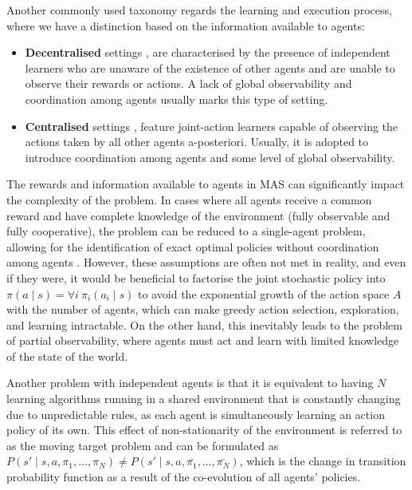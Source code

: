 \documentclass[a4paper,singleside,12pt]{report} %
\begin{document}
Another commonly used taxonomy regards the learning and execution process, where we have a distinction based on the information available to agents:

\begin{itemize}
\item
  \textbf{Decentralised} settings \cite{Bowling2002MultiagentLU, kapetanakis2002reinforcement}, are characterised by the presence of independent learners who are unaware of the existence of other agents and are unable to observe their rewards or actions. A lack of global observability and coordination among agents usually marks this type of setting.
\item
  \textbf{Centralised} settings \cite{hu2003nash, littman2001friend}, feature joint-action learners capable of observing the actions taken by all other agents a-posteriori. Usually, it is adopted to introduce coordination among agents and some level of global observability.
\end{itemize}

The rewards and information available to agents in MAS can significantly impact the complexity of the problem. In cases where all agents receive a common reward and have complete knowledge of the environment (fully observable and fully cooperative), the problem can be reduced to a single-agent problem, allowing for the identification of exact optimal policies without coordination among agents \cite{HernandezLeal2017ASO}. However, these assumptions are often not met in reality, and even if they were, it would be beneficial to factorise the joint stochastic policy into ${\pi(a \mid s) = \forall i\ \pi_i (a_i \mid s)}$ to avoid the exponential growth of the action space $A$ with the number of agents, which can make greedy action selection, exploration, and learning intractable. On the other hand, this inevitably leads to the problem of partial observability, where agents must act and learn with limited knowledge of the state of the world. 

Another problem with independent agents is that it is equivalent to having $N$ learning algorithms running in a shared environment that is constantly changing due to unpredictable rules, as each agent is simultaneously learning an action policy of its own. This effect of non-stationarity of the environment is referred to as the moving target problem and can be formulated as \(P(s' \mid s, a, \pi_1, \dots, \pi_N) \neq P(s' \mid s, a, \bar{\pi_1}, \dots, \bar{\pi_N})\), which is the change in transition probability function as a result of the co-evolution of all agents' policies.
\end{document}
